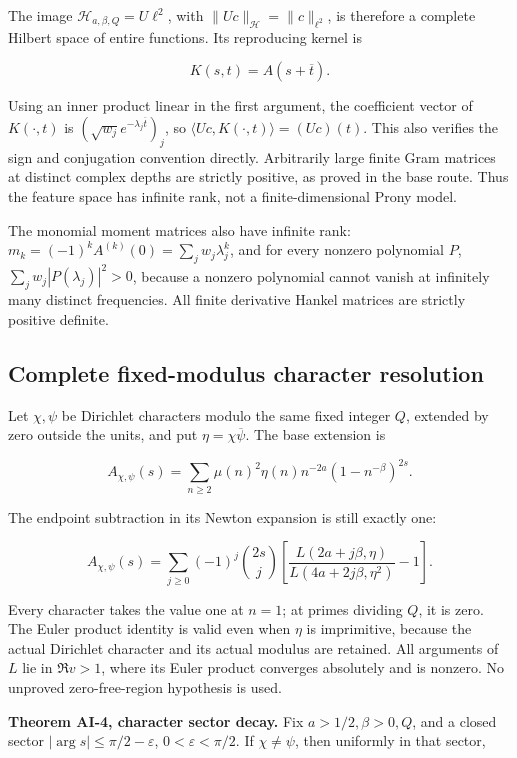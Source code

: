 The image \(\mathcal H_{a,\beta,Q}=U\ell^2\), with
\(\|Uc\|_{\mathcal H}=\|c\|_{\ell^2}\), is therefore a complete Hilbert
space of entire functions. Its reproducing kernel is

\[
 K(s,t)=A(s+\overline t).
\]

Using an inner product linear in the first argument, the coefficient
vector of \(K(\cdot,t)\) is \((\sqrt{w_j}e^{-\lambda_j\overline t})_j\),
so \(\langle Uc,K(\cdot,t)\rangle=(Uc)(t)\). This also verifies the sign
and conjugation convention directly. Arbitrarily large finite Gram
matrices at distinct complex depths are strictly positive, as proved in
the base route. Thus the feature space has infinite rank, not a
finite-dimensional Prony model.

The monomial moment matrices also have infinite rank:
\(m_k=(-1)^kA^{(k)}(0)=\sum_jw_j\lambda_j^k\), and for every nonzero
polynomial \(P\), \(\sum_jw_j|P(\lambda_j)|^2>0\), because a nonzero
polynomial cannot vanish at infinitely many distinct frequencies. All
finite derivative Hankel matrices are strictly positive definite.

\hypertarget{complete-fixed-modulus-character-resolution}{%
\subsection{Complete fixed-modulus character
resolution}\label{complete-fixed-modulus-character-resolution}}

Let \(\chi,\psi\) be Dirichlet characters modulo the same fixed integer
\(Q\), extended by zero outside the units, and put
\(\eta=\chi\overline\psi\). The base extension is

\[
 A_{\chi,\psi}(s)=\sum_{n\ge2}\mu(n)^2
            \eta(n)n^{-2a}(1-n^{-\beta})^{2s}.
\]

The endpoint subtraction in its Newton expansion is still exactly one:

\[
 A_{\chi,\psi}(s)
 =\sum_{j\ge0}(-1)^j\binom{2s}{j}
 \left[\frac{L(2a+j\beta,\eta)}
              {L(4a+2j\beta,\eta^2)}-1\right].
\]

Every character takes the value one at \(n=1\); at primes dividing
\(Q\), it is zero. The Euler product identity is valid even when
\(\eta\) is imprimitive, because the actual Dirichlet character and its
actual modulus are retained. All arguments of \(L\) lie in \(\Re v>1\),
where its Euler product converges absolutely and is nonzero. No unproved
zero-free-region hypothesis is used.

\textbf{Theorem AI-4, character sector decay.} Fix \(a>1/2,\beta>0,Q\),
and a closed sector \(|\arg s|\le\pi/2-\varepsilon\),
\(0<\varepsilon<\pi/2\). If \(\chi\ne\psi\), then uniformly in that
sector,

